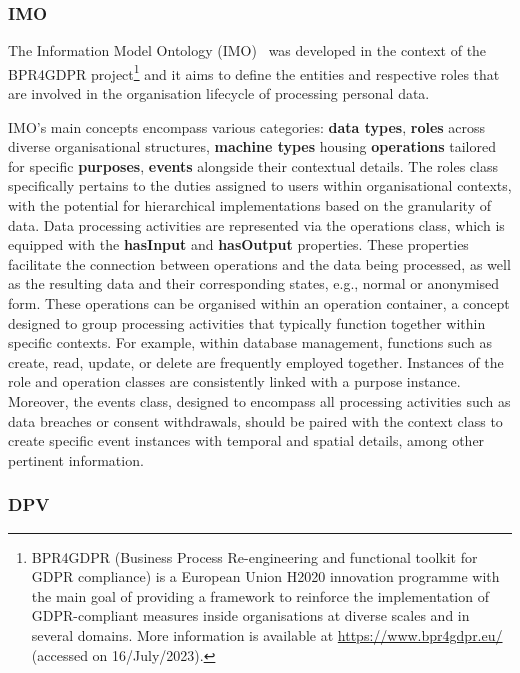 \subsubsection{IMO}
\label{sec:imo}

The Information Model Ontology (IMO)~\citep{papagiannakopoulou_leveraging_2014,lioudakis_compliance_2019} was developed in the context of the BPR4GDPR project\footnote{BPR4GDPR (Business Process Re-engineering and functional toolkit for GDPR compliance) is a European Union H2020 innovation programme with the main goal of providing a framework to reinforce the implementation of GDPR-compliant measures inside organisations at diverse scales and in several domains. More information is available at \url{https://www.bpr4gdpr.eu/} (accessed on 16/July/2023).} and it aims to define the entities and respective roles that are involved in the organisation lifecycle of processing personal data.

IMO's main concepts encompass various categories: \textbf{data types}, \textbf{roles} across diverse organisational structures, \textbf{machine types} housing \textbf{operations} tailored for specific \textbf{purposes}, \textbf{events} alongside their contextual details.
The roles class specifically pertains to the duties assigned to users within organisational contexts, with the potential for hierarchical implementations based on the granularity of data.
Data processing activities are represented via the operations class, which is equipped with the \textbf{hasInput} and \textbf{hasOutput} properties.
These properties facilitate the connection between operations and the data being processed, as well as the resulting data and their corresponding states, e.g., normal or anonymised form.
These operations can be organised within an operation container, a concept designed to group processing activities that typically function together within specific contexts.
For example, within database management, functions such as create, read, update, or delete are frequently employed together.
Instances of the role and operation classes are consistently linked with a purpose instance.
Moreover, the events class, designed to encompass all processing activities such as data breaches or consent withdrawals, should be paired with the context class to create specific event instances with temporal and spatial details, among other pertinent information.

\subsubsection{DPV}
\label{sec:dpv}

